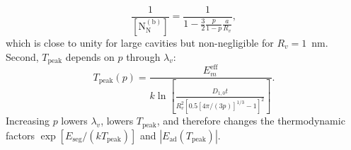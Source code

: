 \documentclass[preprint,12pt,sort&compress]{elsarticle}
\newcommand{\?}{\stackrel{?}{=}}
\begin{document}
\begin{equation}
\frac{1}{[\text{N}_\text{N}^{(\text{b})}]} = \frac{1}{1 - \frac{3}{2} \frac{p}{1-p} \frac{a}{R_v}},
\end{equation}
which is close to unity for large cavities but non-negligible for $R_v=1$~nm. Second, $T_\text{peak}$ depends on $p$ through $\lambda_v$:
\begin{equation}
T_\text{peak}(p) = \frac{ E_m^\mathrm{eff} } { k \ln \! \left[ \tfrac{ D_{1,0} t } { R_v^2
\left[ 0.5 \left[ 4\pi/(3p) \right]^{1/3} - 1 \right]^2 } \right] }.
\label{Eq:App:Tpeak_p}
\end{equation}
Increasing $p$ lowers $\lambda_v$, lowers $T_\text{peak}$, and therefore changes the thermodynamic factors $\exp[E_\text{seg}/(kT_\text{peak})]$ and $|E_\text{ad}(T_\text{peak})|$.


\end{document}
